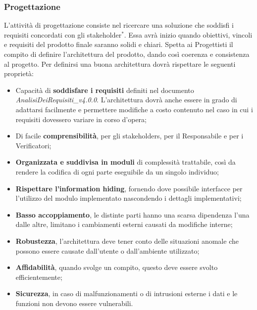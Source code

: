 \documentclass[11pt,a4paper]{article}
\begin{document}
{	\subsubsection{Progettazione}
	L'attività di progettazione consiste nel ricercare una soluzione che soddisfi i requisiti concordati con gli stakeholder$^*$. Essa avrà inizio quando obiettivi, vincoli e requisiti del prodotto finale saranno solidi e chiari. Spetta ai Progettisti il compito di definire l'architettura del prodotto, dando così coerenza e consistenza al progetto. Per definirsi una buona architettura dovrà rispettare le seguenti proprietà:
	\begin{itemize}
		\item Capacità di \textbf{soddisfare i requisiti} definiti nel documento \textit{AnalisiDeiRequisiti\_v4.0.0}. L'architettura dovrà anche essere in grado di adattarsi facilmente e permettere modifiche a costo contenuto nel caso in cui i requisiti dovessero variare in corso d'opera;
		\item Di facile \textbf{comprensibilità}, per gli stakeholders, per il Responsabile e per i Verificatori;
		\item \textbf{Organizzata e suddivisa in moduli} di complessità trattabile, così da rendere la codifica di ogni parte eseguibile da un singolo individuo;
		\item \textbf{Rispettare l'information hiding}, fornendo dove possibile interfacce per l'utilizzo del modulo implementato nascondendo i dettagli implementativi;
		\item \textbf{Basso accoppiamento}, le distinte parti hanno una scarsa dipendenza l'una dalle altre, limitano i cambiamenti esterni causati da modifiche interne;
		\item \textbf{Robustezza}, l'architettura deve tener conto delle situazioni anomale che possono essere causate dall'utente o dall'ambiente utilizzato;
		\item \textbf{Affidabilità}, quando svolge un compito, questo deve essere svolto efficientemente;
		\item \textbf{Sicurezza}, in caso di malfunzionamenti o di intrusioni esterne i dati e le funzioni non devono essere vulnerabili.
	\end{itemize}	
}
\end{document}
